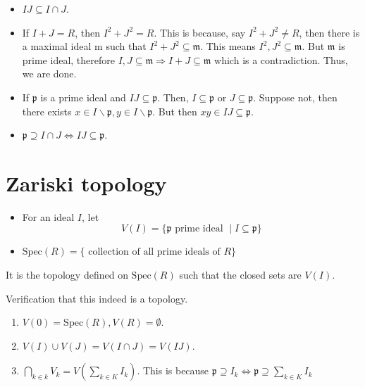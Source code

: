 \documentclass[oneside, 12pt, ]{scrbook}
\theoremstyle{theorem}
\begin{document}
\begin{itemize}
\item $IJ \subseteq I \cap J$.
\item If $I+J = R$, then $I^2 + J^2 = R$. This is because, say $I^2 + J^2 \neq R$, then there is a maximal ideal $\mathrm{m}$ such that $I^2 + J^2 \subseteq \mathfrak{m}$. This means $I^2, J^2 \subseteq \mathfrak{m}$. But $\mathfrak{m}$ is prime ideal, therefore $I,J \subseteq \mathfrak{m} \Rightarrow I+J \subseteq \mathfrak{m}$ which is a contradiction. Thus, we are done. 
\item If $\mathfrak{p}$ is a prime ideal and $IJ \subseteq \mathfrak{p}$. Then, $I \subseteq \mathfrak{p}$ or $J \subseteq \mathfrak{p}$. Suppose not, then there exists $x \in I \backslash \mathfrak{p} , y \in I \backslash \mathfrak{p}$. But then $xy \in IJ \subseteq \mathfrak{p}$.
\item $\mathfrak{p} \supseteq I \cap J \Leftrightarrow IJ \subseteq \mathfrak{p}$.
\end{itemize}

\section{Zariski topology}

\begin{definition}
\begin{itemize}
\item For an ideal $I$, let $$V(I) = \{\mathfrak{p} \text{ prime ideal }\mid I \subseteq \mathfrak{p}\}$$
\item $\mathrm{Spec}(R)=\{ \text{ collection of all prime ideals of }R\}$
\end{itemize}
\end{definition}

\begin{definition}
It is the topology defined on $\mathrm{Spec}(R)$ such that the closed sets are $V(I)$.
\end{definition}

Verification that this indeed is a topology. 
\begin{enumerate}
\item $V(0) = \mathrm{Spec}(R), V(R) = \emptyset$.
\item $V(I) \cup V(J) = V(I\cap J) = V(IJ)$.
\item $\bigcap_{k \in k} V_{k} = V(\sum_{k \in K} I_{k})$. This is because $\mathfrak{p} \supseteq I_{k} \Leftrightarrow \mathfrak{p} \supseteq \sum_{k \in K}I_{k}$
\end{enumerate}
\end{document}
